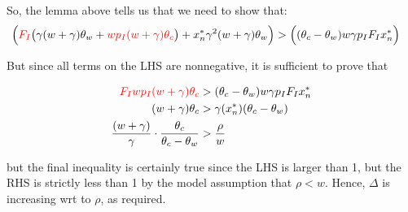 \documentclass[12pt]{article}
\begin{document}
So, the lemma above tells us that we need to show that:
\begin{align}
    \Big({\color{red}F_I}\big(\gamma(w+\gamma)\theta_w+{\color{red}wp_I(w+\gamma)\theta_c}\big) + x^*_n\gamma^2(w+\gamma)\theta_w\Big) &> \Big((\theta_c-\theta_w)w\gamma p_IF_Ix^*_n\Big)
\end{align}

But since all terms on the LHS are nonnegative, it is sufficient to prove that

\begin{align}
    {\color{red}F_Iwp_I(w+\gamma)\theta_c} &> (\theta_c-\theta_w)w\gamma p_IF_Ix^*_n \\
    (w+\gamma)\theta_c &> \gamma(x^*_n)(\theta_c-\theta_w) \\
    \frac{(w+\gamma)}{\gamma} \cdot \frac{\theta_c}{\theta_c-\theta_w} &> \frac{\rho}{w} \\
\end{align}

but the final inequality is certainly true since the LHS is larger than 1, but the RHS is strictly less than 1 by the model assumption that $\rho < w$. Hence, $\Delta$ is increasing wrt to $\rho$, as required.
\end{document}
